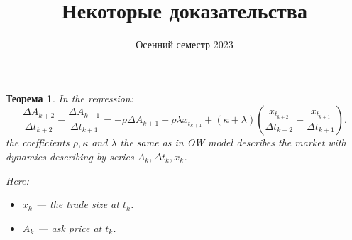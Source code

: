 \documentclass[a4paper]{article}
\date{Осенний семестр 2023}
\title{Некоторые доказательства}
\newtheorem{theorem}{Теорема}
\theoremstyle{definition}
\begin{document}
\begin{theorem}
    In the regression:                                                                                                                                                                                                                                                                                                                                                                                        
    \begin{equation*}
        \frac{\Delta A_{k+2}}{\Delta t_{k+2}} - \frac{\Delta A_{k+1}}{\Delta t_{k+1}} 
    = - \rho \Delta A_{k+1} + \rho \lambda x_{t_{k+1}} + 
    (\kappa + \lambda) (\frac{x_{t_{k+2}}}{\Delta t_{k+2}} - \frac{x_{t_{k+1}}}{\Delta t_{k+1}}).
    \end{equation*}
    the coefficients $\rho, \kappa$ and $\lambda$ the same as in OW model describes the market with dynamics
    describing by series $A_k, \Delta t _k, x_k$.

Here:
\begin{itemize}
\item $x_{k}$ 
--- the trade size at $t_k$.
\item $A_{k}$ --- ask price at $t_k$. 
\end{itemize}

\end{theorem}
\end{document}
